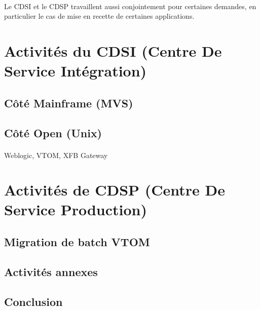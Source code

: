 \documentclass[a4paper,12pt]{report}
\begin{document}
	\paragraph{}
	Le CDSI et le CDSP travaillent aussi conjointement pour certaines demandes, en particulier le cas de mise en recette de certaines applications.
	
\newpage	
\section{Activités du CDSI (Centre De Service Intégration)}
	\subsection{Côté Mainframe (MVS)}
	\paragraph*{}
	
	
	\subsection{Côté Open (Unix)}
	\paragraph*{}
	Weblogic, VTOM, XFB Gateway 
	
\newpage	
\section{Activités de CDSP (Centre De Service Production)}
	\subsection{Migration de batch VTOM}
	\paragraph*{}
	
	
	\subsection{Activités annexes}
	\paragraph*{}
	
	
\newpage	
\begin{center}
\section*{Conclusion}
\end{center}
\paragraph*{}
\end{document}
